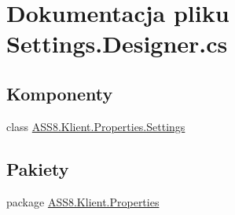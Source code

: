 \hypertarget{a00052}{
\section{Dokumentacja pliku Settings.Designer.cs}
\label{d1/d84/a00052}
}
\subsection*{Komponenty}
\begin{CompactItemize}
\item 
class \hyperlink{a00027}{ASS8.Klient.Properties.Settings}
\end{CompactItemize}
\subsection*{Pakiety}
\begin{CompactItemize}
\item 
package \hyperlink{a00061}{ASS8.Klient.Properties}
\end{CompactItemize}
